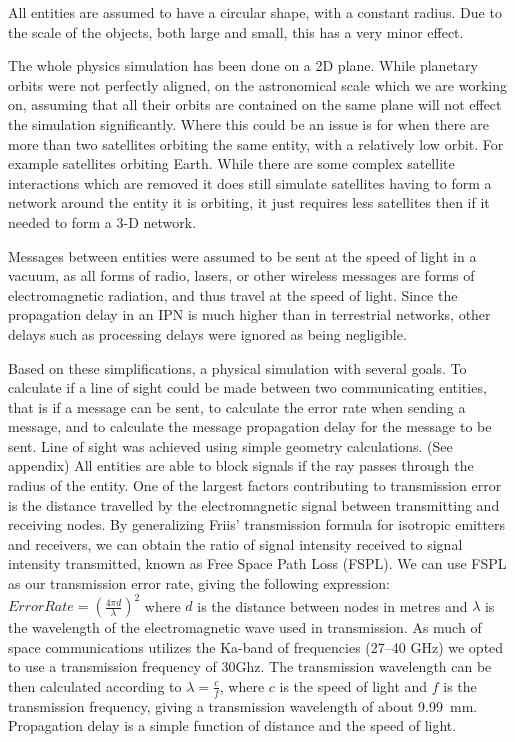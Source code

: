 \documentclass[a4paper,12pt]{article}
\begin{document}
All entities are assumed to have a circular shape, with a constant radius. Due
to the scale of the objects, both large and small, this has a very minor effect.

The whole physics simulation has been done on a 2D plane. While planetary orbits
were not perfectly aligned, on the astronomical scale which we are working on,
assuming that all their orbits are contained on the same plane will not effect
the simulation significantly. Where this could be an issue is for when there are
more than two satellites orbiting the same entity, with a relatively low orbit.
For example satellites orbiting Earth. While there are some complex satellite
interactions which are removed it does still simulate satellites having to form
a network around the entity it is orbiting, it just requires less satellites
then if it needed to form a 3-D network.

Messages between entities were assumed to be sent at the speed of light in a
vacuum, as all forms of radio, lasers, or other wireless messages are forms of
electromagnetic radiation, and thus travel at the speed of light. Since the
propagation delay in an IPN is much higher than in terrestrial networks, other
delays such as processing delays were ignored as being negligible.

Based on these simplifications, a physical simulation with several goals. To
calculate if a line of sight could be made between two communicating entities,
that is if a message can be sent, to calculate the error rate when sending a
message, and to calculate the message propagation delay for the message to be
sent. Line of sight was achieved using simple geometry calculations. (See
appendix) All entities are able to block signals if the ray passes through the
radius of the entity. One of the largest factors contributing to transmission
error is the distance travelled by the electromagnetic signal between
transmitting and receiving nodes. By generalizing Friis' transmission
formula\cite{Friis} for isotropic emitters and receivers, we can obtain the
ratio of signal intensity received to signal intensity transmitted, known as
Free Space Path Loss (FSPL). We can use FSPL as our transmission error rate,
giving the following expression: $Error Rate = {(\frac{4 \pi d}{\lambda})}^2$
where $d$ is the distance between nodes in metres and $\lambda$ is the
wavelength of the electromagnetic wave used in transmission. As much of space
communications utilizes the Ka-band of frequencies (27--40
GHz)\cite{Morabito_Hastrup} we opted to use a transmission frequency of 30Ghz.
The transmission wavelength can be then calculated according to
$\lambda = \frac{c}{f}$, where $c$ is the speed of light and $f$ is the
transmission frequency, giving a transmission wavelength of about 9.99~mm.
Propagation delay is a simple function of distance and the speed of light.
\end{document}
